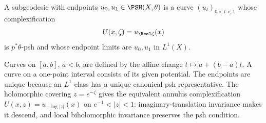 \begin{definition}\label{def:relative-subgeodesic}
A subgeodesic with endpoints $u_0,u_1\in\PSH(X,\theta)$ is a curve $(u_t)_{0<t<1}$ whose complexification
\[
 U(x,\zeta)=u_{\Real\zeta}(x)
\]
is $p^*\theta$-psh and whose endpoint limits are $u_0,u_1$ in $L^1(X)$.
\end{definition}
Curves on $[a,b]$, $a<b$, are defined by the affine change $t\mapsto a+(b-a)t$. A curve on a one-point interval consists of its given potential.
The endpoints are unique because an $L^1$ class has a unique canonical psh representative. The holomorphic covering $z=e^{-\zeta}$ gives the equivalent annulus complexification $U(x,z)=u_{-\log|z|}(x)$ on $e^{-1}<|z|<1$: imaginary-translation invariance makes it descend, and local biholomorphic invariance preserves the psh condition.

